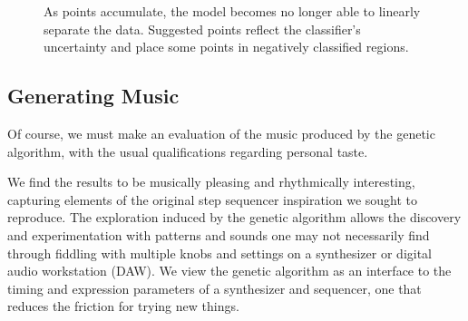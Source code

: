 \documentclass[conference]{IEEEtran}
\begin{document}
\begin{figure}[htbp]
    \caption{As points accumulate, the model becomes no longer able to linearly separate the data.
        Suggested points reflect the classifier's uncertainty and place some points in
        negatively classified regions.}
    \label{gen2}
\end{figure}


\subsection{Generating Music}

Of course, we must make an evaluation of the music produced by the genetic
algorithm, with the usual qualifications regarding personal taste.\footnotemark
{}

We find the results to be musically pleasing and rhythmically interesting,
capturing elements of the original step sequencer inspiration we sought to
reproduce. The exploration induced by the genetic algorithm allows the
discovery and experimentation with patterns and sounds one may not necessarily
find through fiddling with multiple knobs and settings on a synthesizer or
digital audio workstation (DAW). We view the genetic algorithm as an interface
to the timing and expression parameters of a synthesizer and sequencer, one
that reduces the friction for trying new things.
\end{document}
